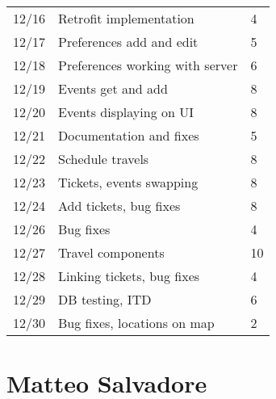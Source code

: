 \begin{table}[H]
\begin{tabular}{ p{2cm} p{10cm} p{3cm}}
	12/16 & Retrofit implementation & 4 \\
	12/17 & Preferences add and edit & 5 \\
	12/18 & Preferences working with server & 6 \\
	12/19 & Events get and add & 8 \\
	12/20 & Events displaying on UI & 8 \\
	12/21 & Documentation and fixes & 5 \\
	12/22 & Schedule travels & 8 \\
	12/23 & Tickets, events swapping & 8 \\
	12/24 & Add tickets, bug fixes & 8 \\
	12/26 & Bug fixes & 4 \\
	12/27 & Travel components & 10 \\
	12/28 & Linking tickets, bug fixes & 4 \\
	12/29 & DB testing, ITD & 6 \\
	12/30 & Bug fixes, locations on map & 2 \\
	\end{tabular}
\end{table}

\section{Matteo Salvadore}

